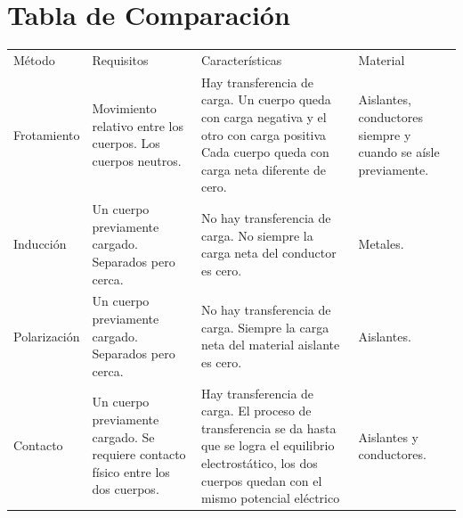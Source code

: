 \section{Tabla de Comparación}
\begin{table}[H]
	\centering
	\begin{tabular}{L{2.2cm}L{3.5cm}L{5.3cm}C{3cm}}
		Método & Requisitos                                                                        & Características                                                                                                                                                        & Material                                                      \\
		Frotamiento              & Movimiento relativo entre los cuerpos. Los cuerpos neutros.                       & Hay transferencia de carga. Un cuerpo queda con carga negativa y el otro con carga positiva Cada cuerpo queda con carga neta diferente de cero.                        & Aislantes, conductores siempre y cuando se aísle previamente. \\
		Inducción                & Un cuerpo previamente cargado. Separados pero cerca.                              & No hay transferencia de carga. No siempre la carga neta del conductor es cero.                                                                                         & Metales.                                                      \\
		Polarización             & Un cuerpo previamente cargado. Separados pero cerca.                              & No hay transferencia de carga. Siempre la carga neta del material aislante es cero.                                                                                    & Aislantes.                                                    \\
		Contacto                 & Un cuerpo previamente cargado. Se requiere contacto físico entre los dos cuerpos. & Hay transferencia de carga. El proceso de transferencia se da hasta que se logra el equilibrio electrostático, los dos cuerpos quedan con el mismo potencial eléctrico & Aislantes y conductores.                                      \\
	\end{tabular}
\end{table}
